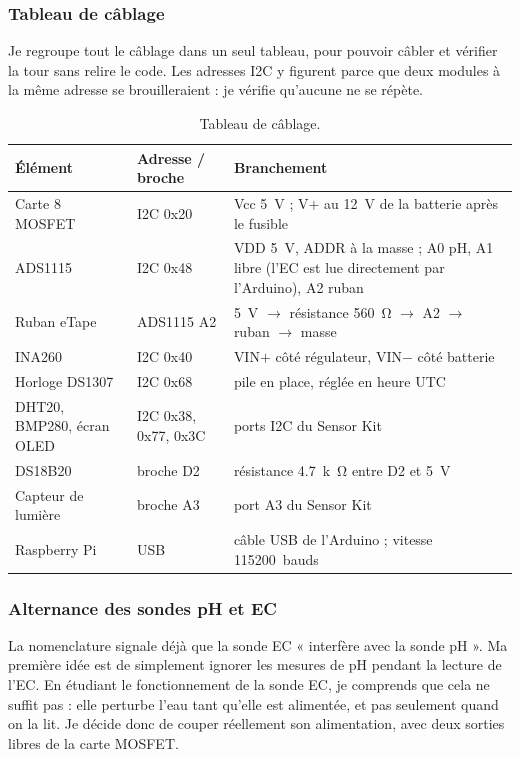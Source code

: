 \subsubsection*{Tableau de câblage}

Je regroupe tout le câblage dans un seul tableau, pour pouvoir câbler et vérifier la tour sans relire le code. Les adresses I2C y figurent parce que deux modules à la même adresse se brouilleraient : je vérifie qu'aucune ne se répète.

\begin{table}[H]
\centering
\small
\begin{tabularx}{\textwidth}{|l|l|Y|}
\hline
\textbf{Élément} & \textbf{Adresse / broche} & \textbf{Branchement} \\
\hline
Carte 8 MOSFET & I2C 0x20 & Vcc \qty{5}{V} ; V$+$ au \qty{12}{V} de la batterie après le fusible \\
\hline
ADS1115 & I2C 0x48 & VDD \qty{5}{V}, ADDR à la masse ; A0 pH, A1 libre (l'EC est lue directement par l'Arduino), A2 ruban \\
\hline
Ruban eTape & ADS1115 A2 & \qty{5}{V} $\to$ résistance \qty{560}{\ohm} $\to$ A2 $\to$ ruban $\to$ masse \\
\hline
INA260 & I2C 0x40 & VIN$+$ côté régulateur, VIN$-$ côté batterie \\
\hline
Horloge DS1307 & I2C 0x68 & pile en place, réglée en heure UTC \\
\hline
DHT20, BMP280, écran OLED & I2C 0x38, 0x77, 0x3C & ports I2C du Sensor Kit \\
\hline
DS18B20 & broche D2 & résistance \qty{4,7}{k\ohm} entre D2 et \qty{5}{V} \\
\hline
Capteur de lumière & broche A3 & port A3 du Sensor Kit \\
\hline
Raspberry Pi & USB & câble USB de l'Arduino ; vitesse \qty{115200}{bauds} \\
\hline
\end{tabularx}
\caption{Tableau de câblage.}
\end{table}

\subsubsection*{Alternance des sondes pH et EC}

La nomenclature signale déjà que la sonde EC « interfère avec la sonde pH ». Ma première idée est de simplement ignorer les mesures de pH pendant la lecture de l'EC. En étudiant le fonctionnement de la sonde EC, je comprends que cela ne suffit pas : elle perturbe l'eau tant qu'elle est alimentée, et pas seulement quand on la lit. Je décide donc de couper réellement son alimentation, avec deux sorties libres de la carte MOSFET.

